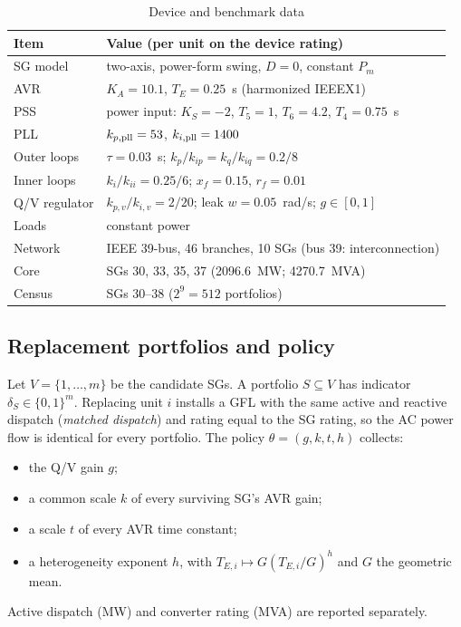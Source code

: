 \documentclass[journal]{IEEEtran}
\theoremstyle{definition}
\theoremstyle{remark}
\begin{document}
\begin{table}[!t]
\centering
\caption{Device and benchmark data}\label{tab:param}
\setlength{\tabcolsep}{3pt}
\footnotesize
\begin{tabular}{@{}lL{0.72\columnwidth}@{}}
\toprule
Item & Value (per unit on the device rating) \\
\midrule
SG model & two-axis, power-form swing, $D=0$, constant $P_m$ \\
AVR & $K_A=10.1$, $T_E=0.25$~s (harmonized IEEEX1) \\
PSS & power input: $K_S=-2$, $T_5=1$, $T_6=4.2$, $T_4=0.75$~s \\
PLL & $k_{p,\rm pll}=53$, $k_{i,\rm pll}=1400$ \\
Outer loops & $\tau=0.03$~s; $k_p/k_{ip}=k_q/k_{iq}=0.2/8$ \\
Inner loops & $k_i/k_{ii}=0.25/6$; $x_f=0.15$, $r_f=0.01$ \\
Q/V regulator & $k_{p,v}/k_{i,v}=2/20$; leak $w=0.05$~rad/s; $g\in[0,1]$ \\
Loads & constant power \\
Network & IEEE 39-bus, 46 branches, 10 SGs (bus 39: interconnection) \\
Core & SGs 30, 33, 35, 37 (2096.6~MW; 4270.7~MVA) \\
Census & SGs 30--38 ($2^9=512$ portfolios) \\
\bottomrule
\end{tabular}
\end{table}

\subsection{Replacement portfolios and policy}
Let $V=\{1,\dots,m\}$ be the candidate SGs. A portfolio $S\subseteq V$ has
indicator $\delta_S\in\{0,1\}^m$. Replacing unit $i$ installs a GFL with the
same active and reactive dispatch (\emph{matched dispatch}) and rating equal to
the SG rating, so the AC power flow is identical for every portfolio. The
policy $\theta=(g,k,t,h)$ collects:
\begin{itemize}
\item the Q/V gain $g$;
\item a common scale $k$ of every surviving SG's AVR gain;
\item a scale $t$ of every AVR time constant;
\item a heterogeneity exponent $h$, with $T_{E,i}\mapsto G(T_{E,i}/G)^h$ and
$G$ the geometric mean.
\end{itemize}
Active dispatch (MW) and converter rating (MVA) are reported separately.
\end{document}
